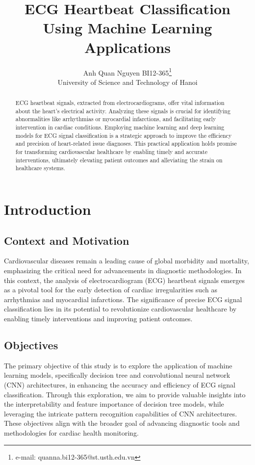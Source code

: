 \documentclass[]{acmsiggraph}
\title{ECG Heartbeat Classification Using Machine Learning Applications}
\author{Anh Quan Nguyen BI12-365\thanks{e-mail: quanna.bi12-365@st.usth.edu.vn}\\University of Science and Technology of Hanoi}
\begin{document}
\maketitle


\begin{abstract}
ECG heartbeat signals, extracted from electrocardiograms, offer vital information about the heart's electrical activity. Analyzing these signals is crucial for identifying abnormalities like arrhythmias or myocardial infarctions, and facilitating early intervention in cardiac conditions. Employing machine learning and deep learning models for ECG signal classification is a strategic approach to improve the efficiency and precision of heart-related issue diagnoses. This practical application holds promise for transforming cardiovascular healthcare by enabling timely and accurate interventions, ultimately elevating patient outcomes and alleviating the strain on healthcare systems.
\end{abstract}

\section{Introduction}

\subsection{Context and Motivation}
Cardiovascular diseases remain a leading cause of global morbidity and mortality, emphasizing the critical need for advancements in diagnostic methodologies. In this context, the analysis of electrocardiogram (ECG) heartbeat signals emerges as a pivotal tool for the early detection of cardiac irregularities such as arrhythmias and myocardial infarctions. The significance of precise ECG signal classification lies in its potential to revolutionize cardiovascular healthcare by enabling timely interventions and improving patient outcomes.

\subsection{Objectives}
The primary objective of this study is to explore the application of machine learning models, specifically decision tree and convolutional neural network (CNN) architectures, in enhancing the accuracy and efficiency of ECG signal classification. Through this exploration, we aim to provide valuable insights into the interpretability and feature importance of decision tree models, while leveraging the intricate pattern recognition capabilities of CNN architectures. These objectives align with the broader goal of advancing diagnostic tools and methodologies for cardiac health monitoring.
\end{document}
